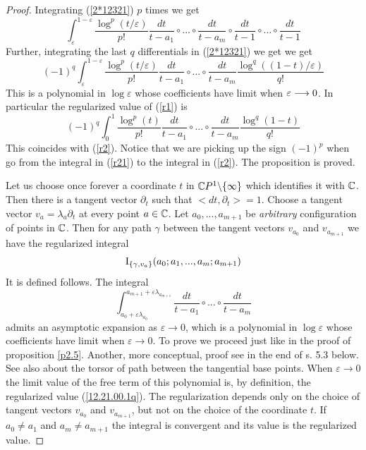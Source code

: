 \documentclass[10pt]{article}
\begin{document}
\begin{proof} Integrating (\ref{2*12321}) $p$ times we get
$$
 \int_{\varepsilon}^{1-\varepsilon}
\frac{\log^p(t/\varepsilon)}{p!}\frac{dt}{t-a_1} \circ ... \circ \frac{dt}{t-a_m} \circ \frac{dt}{t-1}\circ ... \circ \frac{dt}{t-1}
$$
Further, integrating the last $q$ differentials in (\ref{2*12321})  we get 
we get
$$
(-1)^{q}\int_{\varepsilon}^{1-\varepsilon} \frac{\log^p(t/\varepsilon)}{p!} \frac{dt}{t-a_1}  \circ...\circ
\frac{dt}{t-a_m}\frac{\log^q((1-t)/\varepsilon)}{q!}
$$
This is a polynomial in $\log \varepsilon$ whose coefficients have limit when $\varepsilon \longrightarrow 0$. 
In particular the regularized value
of (\ref{r1}) is
\begin{equation} \label{r21}
(-1)^{q}\int_{0}^1\frac{\log^p(t)}{p!}\frac{dt}{t-a_1} \circ...\circ\frac{dt}{t-a_m} \frac{\log^q(1-t)}{q!}
\end{equation}
This coincides with (\ref{r2}). Notice that we are picking up the sign $(-1)^p$ when go from the integral 
in (\ref{r21}) to the integral in  (\ref{r2}). The proposition is proved. 


Let us choose once forever a coordinate $t$ in ${\mathbb C} P^1 \backslash \{\infty\}$ which 
identifies it with ${\mathbb C}$.  Then there is a tangent vector $\partial_t $ such that 
$<dt, \partial_t > = 1$.
Choose a tangent vector $v_{a} = \lambda_a \partial_t$  at every point $a \in {\mathbb C}$.  
Let $a_0, ..., a_{m+1}$ be {\it arbitrary} configuration of points 
in ${\mathbb C}$. 
Then for any path $\gamma$ between the tangent vectors $v_{a_0}$ and 
 $v_{a_{m+1}}$ we have the regularized integral
\begin{equation} \label{12.21.00.1q}
{\rm I}_{\{\gamma, v_a\}}(a_0; a_1, ..., a_m; a_{m+1})
\end{equation} 
It is defined follows.  
The integral 
\begin{equation} \label{12.21.00.112q}
\int_{a_0 + \varepsilon \lambda_{a_0}}^{a_{m+1} + \varepsilon \lambda_{a_{m+1}}} 
\frac{dt}{t-a_1} \circ ... \circ \frac{dt}{t-a_m}
\end{equation} 
admits an asymptotic expansion as $\varepsilon \to 0$, 
which is a polynomial in $\log \varepsilon$ 
whose coefficients have limit when  $\varepsilon \to 0$. To prove we proceed just 
like in the proof of 
proposition \ref{p2.5}. Another, more conceptual,  
proof see in the end of s. 5.3 below. See also \cite{D} about  the torsor 
of path between the tangential base points.
When  
$\varepsilon \to 0$ the limit value of the 
free term of this polynomial is, by definition, the regularized value 
 (\ref{12.21.00.1q}). The regularization  depends only  
on the choice of tangent vectors  $v_{a_0}$ and 
 $v_{a_{m+1}}$, but not on the choice of the coordinate $t$. 
If $a_0 \not = a_1$ and $a_{m} \not = a_{m+1}$ 
the integral is convergent and its value is 
the regularized value.  



\end{proof}
\end{document}
